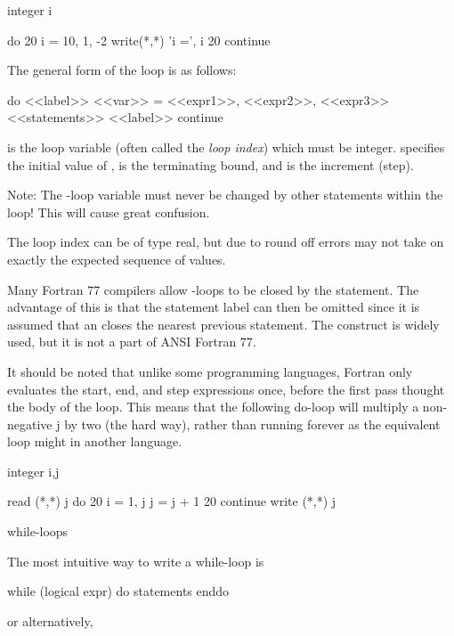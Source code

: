 \begin{fortran77}
      integer i

      do 20 i = 10, 1, -2
         write(*,*) 'i =', i
  20  continue
\end{fortran77}

The general form of the  loop is as follows:

\begin{fortran77}
      do <<label>>  <<var>> =  <<expr1>>, <<expr2>>, <<expr3>>
         <<statements>>
<<label>> continue
\end{fortran77}

 is the loop variable (often called the
\textit{loop index}) which must be integer.  specifies the initial
value of ,  is the
terminating bound, and  is the increment
(step).

Note: The -loop variable must never be changed by
other statements within the loop! This will cause great confusion.

The loop index can be of type real, but due to round off errors may not
take on exactly the expected sequence of values.

Many Fortran 77 compilers allow -loops to be closed
by the  statement. The advantage of this is that
the statement label can then be omitted since it is assumed that an
 closes the nearest previous 
statement. The  construct is widely used, but it
is not a part of ANSI Fortran 77.

It should be noted that unlike some programming languages, Fortran only evaluates the start, end, and step expressions once, before the first pass thought the body of the loop. This means that the following do-loop will multiply a non-negative j by two (the hard way), rather than running forever as the equivalent loop might in another language.

      integer i,j
 
      read (*,*) j
      do 20 i = 1, j
         j = j + 1
  20  continue
      write (*,*) j

while-loops

The most intuitive way to write a while-loop is

      while (logical expr) do
         statements
      enddo

or alternatively,

